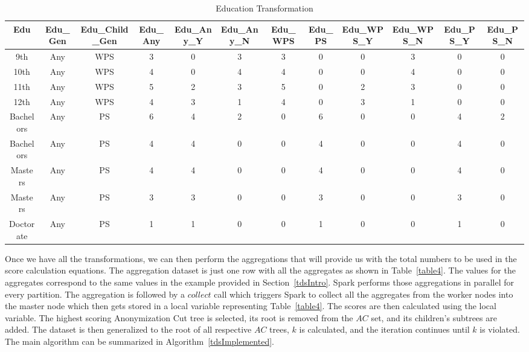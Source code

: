 \documentclass[11pt]{article}       %
\begin{document}
\begin{table}[htp]
\begin{adjustbox}{width=\textwidth, center}
\begin{tabular}{|c|c|c|c|c|c|c|c|c|c|c|c|}
\hline
Edu & Edu\_Gen & Edu\_Child\_Gen & Edu\_Any & Edu\_Any\_Y & Edu\_Any\_N & Edu\_WPS & Edu\_PS & Edu\_WPS\_Y & Edu\_WPS\_N & Edu\_PS\_Y & Edu\_PS\_N\\
\hline
9th & Any & WPS & 3 & 0 & 3 & 3 & 0 & 0 & 3 & 0 & 0\\
10th & Any & WPS & 4 & 0 & 4 & 4 & 0 & 0 & 4 & 0 & 0\\
11th & Any & WPS & 5 & 2 & 3 & 5 & 0 & 2 & 3 & 0 & 0\\
12th & Any & WPS & 4 & 3 & 1 & 4 & 0 & 3 & 1 & 0 & 0\\
Bachelors & Any & PS & 6 & 4 & 2 & 0 & 6 & 0 & 0 & 4 & 2\\
Bachelors & Any & PS & 4 & 4 & 0 & 0 & 4 & 0 & 0 & 4 & 0\\
Masters & Any & PS & 4 & 4 & 0 & 0 & 4 & 0 & 0 & 4 & 0\\
Masters & Any & PS & 3 & 3 & 0 & 0 & 3 & 0 & 0 & 3 & 0\\
Doctorate & Any & PS & 1 & 1 & 0 & 0 & 1 & 0 & 0 & 1 & 0\\
\hline
\end{tabular}
\end{adjustbox}
\caption{Education Transformation}
\label{table3}
\end{table}

Once we have all the transformations, we can then perform the aggregations that will provide us with the total numbers to be used in the score calculation equations. The aggregation dataset is just one row with all the aggregates as shown in Table~\ref{table4}. The values for the aggregates correspond to the same values in the example provided in Section~\ref{tdsIntro}. Spark performs those aggregations in parallel for every partition. The aggregation is followed by a $collect$ call which triggers Spark to collect all the aggregates from the worker nodes into the master node which then gets stored in a local variable representing Table~\ref{table4}. The scores are then calculated using the local variable. The highest scoring Anonymization Cut tree is selected, its root is removed from the $AC$ set, and its children's subtrees are added. The dataset is then generalized to the root of all respective $AC$ trees, $k$ is calculated, and the iteration continues until $k$ is violated. The main algorithm can be summarized in Algorithm~\ref{tdsImplemented}.
\end{document}
